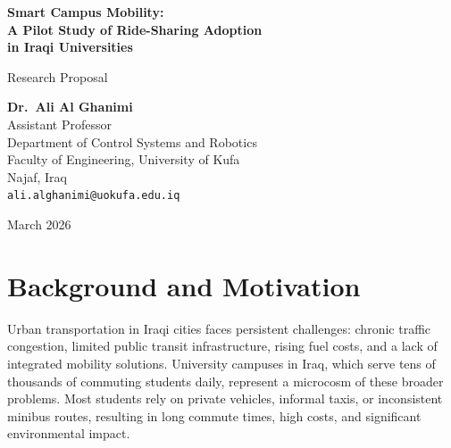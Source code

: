 \documentclass[12pt,a4paper]{article}
\begin{document}
\begin{titlepage}
  \centering
  \vspace*{2cm}

  {\LARGE\bfseries Smart Campus Mobility:\\[6pt]
   A Pilot Study of Ride-Sharing Adoption\\[6pt]
   in Iraqi Universities\par}

  \vspace{1.5cm}
  {\Large Research Proposal\par}

  \vspace{2cm}
  {\large
    \textbf{Dr.\ Ali Al Ghanimi}\\[6pt]
    Assistant Professor\\[4pt]
    Department of Control Systems and Robotics\\[4pt]
    Faculty of Engineering, University of Kufa\\[4pt]
    Najaf, Iraq\\[8pt]
    \texttt{ali.alghanimi@uokufa.edu.iq}
  \par}

  \vfill
  {\large March 2026\par}
\end{titlepage}

\newpage
\tableofcontents
\newpage

\section{Background and Motivation}
\label{sec:background}

Urban transportation in Iraqi cities faces persistent challenges: chronic traffic congestion, limited public transit infrastructure, rising fuel costs, and a lack of integrated mobility solutions. University campuses in Iraq, which serve tens of thousands of commuting students daily, represent a microcosm of these broader problems. Most students rely on private vehicles, informal taxis, or inconsistent minibus routes, resulting in long commute times, high costs, and significant environmental impact.
\end{document}
